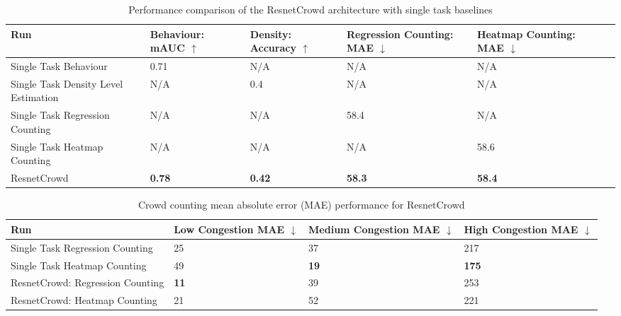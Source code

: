 \documentclass[10pt,twocolumn,letterpaper]{article}
\begin{document}
  
\begin{table*}[h!]
\centering
\begin{tabular}{m{5.5cm} m{1.5cm} m{1.7cm} m{1.7cm} m{1.5cm} m{1.5cm} m{1.5cm}}
\hline
Run                                  & Behaviour: mAUC $\uparrow$  & Density: Accuracy $\uparrow$  & Regression Counting: MAE $\downarrow$ & Heatmap Counting: MAE $\downarrow$ \\ \hline
Single Task Behaviour                & 0.71            & N/A                                         & N/A                       & N/A                    \\ \hline
Single Task Density Level Estimation & N/A             & 0.4                                         & N/A                       & N/A                    \\ \hline
Single Task Regression Counting      & N/A             & N/A                                          & 58.4                      & N/A                    \\ \hline
Single Task Heatmap Counting         & N/A             & N/A                                          & N/A                       & 58.6                   \\ \hline
ResnetCrowd                          & \textbf{0.78}   & \textbf{0.42}                              & \textbf{58.3}                      & \textbf{58.4}                   \\ \hline
\end{tabular}
\caption{Performance comparison of the ResnetCrowd architecture with single task baselines}
\label{overall_performance}
\end{table*}

\begin{table*}[h!]
\centering
\begin{tabular}{m{6cm} m{2.5cm} m{3.0cm} m{2.5cm}}
\hline 
Run                               & Low Congestion MAE  $\downarrow$     & Medium Congestion MAE $\downarrow$  & High Congestion MAE $\downarrow$     \\ \hline
Single Task Regression Counting   & 25            & 37          & 217          \\ \hline
Single Task Heatmap Counting      & 49            & \textbf{19} & \textbf{175} \\ \hline
ResnetCrowd: Regression Counting & \textbf{11}            & 39          & 253         \\ \hline
ResnetCrowd: Heatmap Counting     & 21            & 52          & 221         \\ \hline
\end{tabular}
\caption{Crowd counting mean absolute error (MAE) performance for ResnetCrowd}
\label{counting_breakdown}
\end{table*}
   
\end{document}
